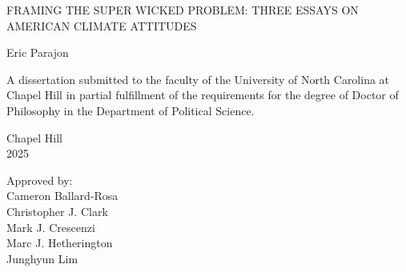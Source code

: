 \begin{titlepage}
\begin{center}


\vspace{60pt}
\begin{singlespace}
FRAMING THE SUPER WICKED PROBLEM: THREE ESSAYS ON AMERICAN CLIMATE ATTITUDES
 \end{singlespace}


\vspace*{64pt} %
Eric Parajon
\end{center}



\vspace{40pt}
\begin{singlespace}
\noindent
\begin{center}
A dissertation submitted to the faculty of the University of North Carolina at Chapel Hill
in partial fulfillment of the requirements for the degree of Doctor of Philosophy in
the Department of Political Science.
\end{center}
\end{singlespace}


\vspace{40pt}
\begin{center}
\begin{singlespace}
Chapel Hill\\
2025
\end{singlespace}
\end{center}


\vspace{46pt}
\begin{flushright}
\begin{minipage}{2.0in}
Approved by:\\
Cameron Ballard-Rosa \\
Christopher J. Clark \\
Mark J. Crescenzi \\
Marc J. Hetherington \\
Junghyun Lim
\end{minipage}
\end{flushright}

\end{titlepage}